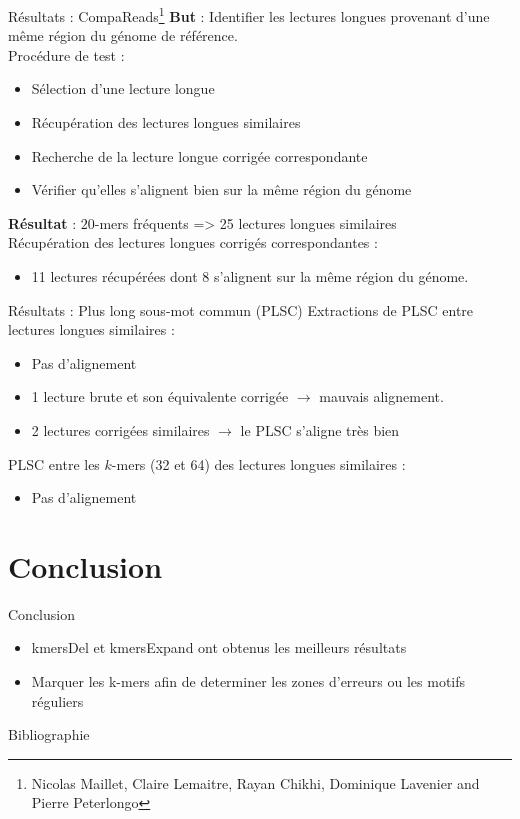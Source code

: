\documentclass[11pt]{beamer}
\begin{document}
\begin{frame}[fragile]{Résultats : CompaReads\footnote{Nicolas Maillet, Claire Lemaitre, Rayan Chikhi, Dominique Lavenier and Pierre Peterlongo\cite{CompaReads2012}}}
  \textbf{But} : Identifier les lectures longues provenant d'une même région du génome de référence.\medskip\pause\\
  Procédure de test :\pause
  \begin{itemize}[<+-| alert@+>]
    \item Sélection d'une lecture longue
    \item Récupération des lectures longues similaires
    \item Recherche de la lecture longue corrigée correspondante
    \item Vérifier qu'elles s'alignent bien sur la même région du génome
  \end{itemize}\pause
  \textbf{Résultat} : $20$-mers fréquents => 25 lectures longues similaires\medskip\pause\\
  Récupération des lectures longues corrigés correspondantes :\\
  \begin{itemize}
    \item 11 lectures récupérées dont 8 s'alignent sur la même région du génome.
  \end{itemize}\bigskip
\end{frame}
\begin{frame}[fragile]{Résultats : Plus long sous-mot commun (PLSC)}
  Extractions de PLSC entre lectures longues similaires :\pause
  \begin{itemize}[<+-| alert@+>]
    \item Pas d'alignement
    \item 1 lecture brute et son équivalente corrigée $\rightarrow$ mauvais alignement.
    \item 2 lectures corrigées similaires $\rightarrow$ le PLSC s'aligne très bien
  \end{itemize}\pause
  PLSC entre les $k$-mers (32 et 64) des lectures longues similaires :\\
  \begin{itemize}
    \item Pas d'alignement
  \end{itemize}
\end{frame}

\section{Conclusion}
\begin{frame}{Conclusion}
  \begin{itemize}[<+-| alert@+>]
    \item kmersDel et kmersExpand ont obtenus les meilleurs résultats
    \item Marquer les k-mers afin de determiner les zones d'erreurs ou les motifs réguliers
  \end{itemize}
\end{frame}

\begin{frame}[allowframebreaks]{Bibliographie}
  
  
\end{frame}
\end{document}
